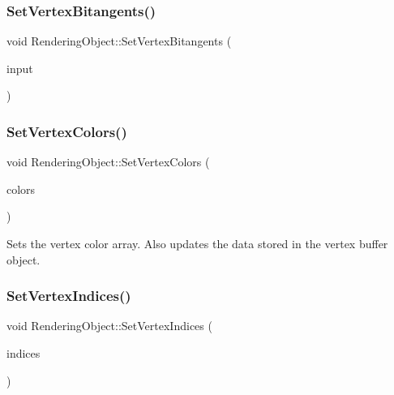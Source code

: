 \subsubsection{\texorpdfstring{Set\+Vertex\+Bitangents()}{SetVertexBitangents()}}
{\footnotesize\ttfamily void Rendering\+Object\+::\+Set\+Vertex\+Bitangents (\begin{DoxyParamCaption}\item[{std\+::unique\+\_\+ptr$<$ \hyperlink{class_rendering_object_a6c6bf305a5f0f9ce1006f374c753c856}{Bitangent\+Array} $>$}]{input }\end{DoxyParamCaption})\hspace{0.3cm}{\ttfamily [virtual]}}

\hypertarget{class_rendering_object_aa1170c47ff02b2305a54c8aab3460201}{}\label{class_rendering_object_aa1170c47ff02b2305a54c8aab3460201} 
\subsubsection{\texorpdfstring{Set\+Vertex\+Colors()}{SetVertexColors()}}
{\footnotesize\ttfamily void Rendering\+Object\+::\+Set\+Vertex\+Colors (\begin{DoxyParamCaption}\item[{std\+::unique\+\_\+ptr$<$ \hyperlink{class_rendering_object_a8a12e1f9be788d99af6c089e1c600022}{Color\+Array} $>$}]{colors }\end{DoxyParamCaption})\hspace{0.3cm}{\ttfamily [virtual]}}



Sets the vertex color array. Also updates the data stored in the vertex buffer object. 

\hypertarget{class_rendering_object_a61ea597df0c456834eac8eb4087fb573}{}\label{class_rendering_object_a61ea597df0c456834eac8eb4087fb573} 
\subsubsection{\texorpdfstring{Set\+Vertex\+Indices()}{SetVertexIndices()}}
{\footnotesize\ttfamily void Rendering\+Object\+::\+Set\+Vertex\+Indices (\begin{DoxyParamCaption}\item[{std\+::unique\+\_\+ptr$<$ \hyperlink{class_rendering_object_a9931c88bca3384065c6691dfe1e60af1}{Index\+Array} $>$}]{indices }\end{DoxyParamCaption})\hspace{0.3cm}{\ttfamily [virtual]}}




